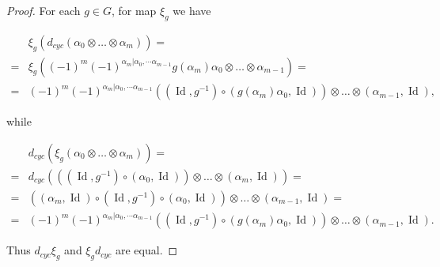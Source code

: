 \documentclass[12pt,a4paper,reqno]{amsart}
\DeclareMathOperator{\id}{Id}
\begin{document}
\begin{proof}
For each $g \in G$, for map $\xi_g$ we have
\begin{small}
\begin{align*}
& \xi_g \left(d_{cyc} \left( \alpha_0 \otimes \dots \otimes \alpha_m
\right) \right) = 
\\
=
& 
\xi_g \left( 
(-1)^{m} (-1)^{\alpha_m | \alpha_0, \dotsm \alpha_{m-1}} 
g(\alpha_m) \alpha_0 \otimes \dots \otimes \alpha_{m-1}  \right) = 
\\
=
&(-1)^{m} (-1)^{\alpha_m | \alpha_0, \dotsm \alpha_{m-1}} 
\left(\left(\id,g^{-1}\right) \circ \left(g(\alpha_m) 
\alpha_0, \id\right)\right)
\otimes \dots \otimes \left(\alpha_{m-1}, \id\right),
\end{align*}
\end{small}
while
\begin{small}
\begin{align*}
&  d_{cyc}\left( \xi_g\left( \alpha_0 \otimes \dots \otimes \alpha_m
\right) \right) = 
\\
=
& 
d_{cyc} \left( 
\left(\left(\id,g^{-1}\right) \circ \left(\alpha_0, \id\right)\right)
\otimes \dots \otimes \left(\alpha_{m}, \id \right)
\right)
=
\\
=
&
\left(
\left(\alpha_m,\id\right) \circ \left(\id,g^{-1}\right) 
\circ \left(\alpha_0, \id \right)
\right)
\otimes \dots \otimes \left(\alpha_{m-1}, \id \right)
=
\\
=
&
(-1)^{m} (-1)^{\alpha_m | \alpha_0, \dotsm \alpha_{m-1}} 
\left(\left(\id,g^{-1}\right) \circ \left(g(\alpha_m) \alpha_0, \id\right)
\right) \otimes \dots \otimes \left(\alpha_{m-1}, \id \right). 
\end{align*}
\end{small}
Thus $d_{cyc} \xi_g$ and $\xi_g d_{cyc}$ are equal.  
\end{proof}
\end{document}
